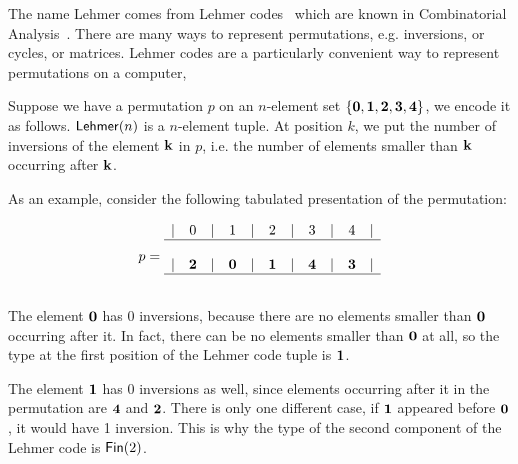 
The name Lehmer comes from Lehmer
codes~\cite{lehmerTeachingCombinatorialTricks1960a} which are known in
Combinatorial Analysis~\cite{bellmanCombinatorialAnalysis1960}. There are many
ways to represent permutations, e.g. inversions, or cycles, or matrices. Lehmer
codes are a particularly convenient way to represent permutations on a
computer,~


Suppose we have a permutation $p$ on an $n$-element set
$\{\mathbf{0}, \mathbf{1}, \mathbf{2}, \mathbf{3}, \mathbf{4}\}$, we encode it as follows.
$\Lehmer[n]$ is a $n$-element tuple. At position $k$, we put the number of
inversions of the element $\mathbf{k}$ in $p$, i.e. the number of elements smaller
than $\mathbf{k}$ occurring after $\mathbf{k}$.

As an example, consider the following tabulated presentation of the permutation:


\[
  p =
  \begin{array}{ccccccccccccccc}
    | & 0      & | & 1      & | & 2      & | & 3      & | & 4      & | \\
    \hline                                                             \\
    | & \mathbf{2} & | & \mathbf{0} & | & \mathbf{1} & | & \mathbf{4} & | & \mathbf{3} & | \\
    \hline                                                             \\
  \end{array}
\]


The element $\mathbf{0}$ has 0 inversions, because there are no elements smaller
than $\mathbf{0}$ occurring after it. In fact, there can be no elements smaller than
$\mathbf{0}$ at all, so the type at the first position of the Lehmer code tuple is
${\mathbf{1}}$.

The element $\mathbf{1}$ has 0 inversions as well, since elements occurring after it
in the permutation are $\mathbf{4}$ and $\mathbf{2}$. There is only one different case,
if $\mathbf{1}$ appeared before $\mathbf{0}$, it would have 1 inversion. This is why the
type of the second component of the Lehmer code is $\Fin[2]$.

